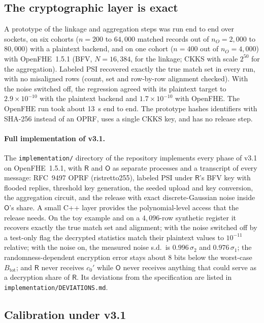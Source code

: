 \documentclass[11pt]{article}
\theoremstyle{definition}
\theoremstyle{plain}
\newcommand{\Party}[1]{\textsf{#1}}
\newcommand{\Rp}{\Party{R}}
\newcommand{\Op}{\Party{O}}
\begin{document}
\subsection{The cryptographic layer is exact}
\label{sec:eval:crypto}

A prototype of the linkage and aggregation steps was run end to end over sockets, on six cohorts ($n = 200$ to $64{,}000$ matched records out of $n_O = 2{,}000$ to $80{,}000$) with a plaintext backend, and on one cohort ($n = 400$ out of $n_O = 4{,}000$) with OpenFHE~1.5.1 (BFV, $N = 16{,}384$, for the linkage; CKKS with scale $2^{50}$ for the aggregation). Labeled PSI recovered exactly the true match set in every run, with no misaligned rows (count, set and row-by-row alignment checked). With the noise switched off, the regression agreed with its plaintext target to $2.9 \times 10^{-10}$ with the plaintext backend and $1.7 \times 10^{-10}$ with OpenFHE. The OpenFHE run took about 13~s end to end. The prototype hashes identifiers with SHA-256 instead of an OPRF, uses a single CKKS key, and has no release step.

\paragraph{Full implementation of v3.1.} The \texttt{implementation/} directory of the repository implements every phase of v3.1 on OpenFHE~1.5.1, with $\Rp$ and $\Op$ as separate processes and a transcript of every message: RFC~9497 OPRF (ristretto255), labeled PSI under $\Rp$'s BFV key with flooded replies, threshold key generation, the seeded upload and key conversion, the aggregation circuit, and the release with exact discrete-Gaussian noise inside $\Op$'s share. A small C++ layer provides the polynomial-level access that the release needs. On the toy example and on a $4{,}096$-row synthetic register it recovers exactly the true match set and alignment; with the noise switched off by a test-only flag the decrypted statistics match their plaintext values to $10^{-11}$ relative; with the noise on, the measured noise s.d.\ is $0.996\,\sigma_2$ and $0.976\,\sigma_1$; the randomness-dependent encryption error stays about 8 bits below the worst-case $B_{\mathrm{tot}}$; and $\Rp$ never receives $c_0'$ while $\Op$ never receives anything that could serve as a decryption share of $\Rp$. Its deviations from the specification are listed in \texttt{implementation/DEVIATIONS.md}.

\subsection{Calibration under v3.1}
\label{sec:eval:calib}
\end{document}
